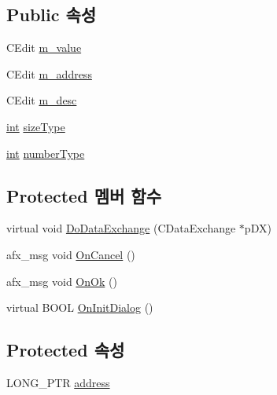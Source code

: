 \subsection*{Public 속성}
\begin{DoxyCompactItemize}
\item 
C\+Edit \mbox{\hyperlink{class_add_g_b_cheat_ac5705ad3d8964adb59d62c51dd60a0fc}{m\+\_\+value}}
\item 
C\+Edit \mbox{\hyperlink{class_add_g_b_cheat_af68f821a3073c6a01f1c8760dab628ee}{m\+\_\+address}}
\item 
C\+Edit \mbox{\hyperlink{class_add_g_b_cheat_ae1711f59505d7d442a6572a346993cd2}{m\+\_\+desc}}
\item 
\mbox{\hyperlink{_util_8cpp_a0ef32aa8672df19503a49fab2d0c8071}{int}} \mbox{\hyperlink{class_add_g_b_cheat_ae0603ce2570d5b09a64f4bd6c2107962}{size\+Type}}
\item 
\mbox{\hyperlink{_util_8cpp_a0ef32aa8672df19503a49fab2d0c8071}{int}} \mbox{\hyperlink{class_add_g_b_cheat_ab49fa34156026418e26edf606aa82b1a}{number\+Type}}
\end{DoxyCompactItemize}
\subsection*{Protected 멤버 함수}
\begin{DoxyCompactItemize}
\item 
virtual void \mbox{\hyperlink{class_add_g_b_cheat_ab90d0a5d50911d10eec2706250882d6f}{Do\+Data\+Exchange}} (C\+Data\+Exchange $\ast$p\+DX)
\item 
afx\+\_\+msg void \mbox{\hyperlink{class_add_g_b_cheat_ac2eb6674e040b6a8af227e6517f857e8}{On\+Cancel}} ()
\item 
afx\+\_\+msg void \mbox{\hyperlink{class_add_g_b_cheat_aef6d73f3cdf51e28bbba9f7e14b21941}{On\+Ok}} ()
\item 
virtual B\+O\+OL \mbox{\hyperlink{class_add_g_b_cheat_a97210ad566b117af4994adac5d954e94}{On\+Init\+Dialog}} ()
\end{DoxyCompactItemize}
\subsection*{Protected 속성}
\begin{DoxyCompactItemize}
\item 
L\+O\+N\+G\+\_\+\+P\+TR \mbox{\hyperlink{class_add_g_b_cheat_adb910488c84e165b4fd33646b932ee2e}{address}}
\end{DoxyCompactItemize}


